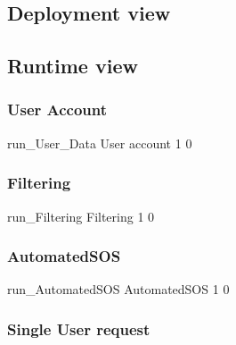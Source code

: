 \documentclass[../DD0.tex]{subfiles}
\begin{document}
\clearpage

  \subsection{Deployment view}
  \label{sec:deplview}

\clearpage

  \subsection{Runtime view}
  \label{sec:runtview}

\subsubsection{User Account}

\label{sec:userdata}

    \fetchUML
      {run_User_Data}
      {User account}
      {1}           %
      {0}           %

  \clearpage



\subsubsection{Filtering}

\label{sec:filtering}

    \fetchUML
      {run_Filtering}
      {Filtering}
      {1}           %
      {0}           %

  \clearpage

\subsubsection{AutomatedSOS}

\label{sec:automatedSOS}

    \fetchUML
      {run_AutomatedSOS}
      {AutomatedSOS}
      {1}           %
      {0}           %

  \clearpage

\subsubsection{Single User request}
\end{document}

